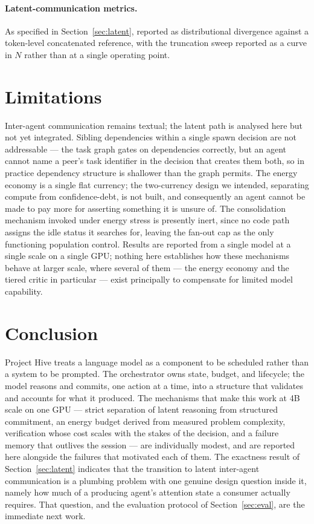 \documentclass[11pt]{article}
\begin{document}
\paragraph{Latent-communication metrics.} As specified in
Section~\ref{sec:latent}, reported as distributional divergence against a
token-level concatenated reference, with the truncation sweep reported as a
curve in $N$ rather than at a single operating point.

\section{Limitations}

Inter-agent communication remains textual; the latent path is analysed here but
not yet integrated. Sibling dependencies within a single spawn decision are not
addressable --- the task graph gates on dependencies correctly, but an agent
cannot name a peer's task identifier in the decision that creates them both, so
in practice dependency structure is shallower than the graph permits. The
energy economy is a single flat currency; the two-currency design we intended,
separating compute from confidence-debt, is not built, and consequently an
agent cannot be made to pay more for asserting something it is unsure of. The
consolidation mechanism invoked under energy stress is presently inert, since
no code path assigns the idle status it searches for, leaving the fan-out cap
as the only functioning population control. Results are reported from a single
model at a single scale on a single GPU; nothing here establishes how these
mechanisms behave at larger scale, where several of them --- the energy economy
and the tiered critic in particular --- exist principally to compensate for
limited model capability.

\section{Conclusion}

Project Hive treats a language model as a component to be scheduled rather than
a system to be prompted. The orchestrator owns state, budget, and lifecycle;
the model reasons and commits, one action at a time, into a structure that
validates and accounts for what it produced. The mechanisms that make this
work at 4B scale on one GPU --- strict separation of latent reasoning from
structured commitment, an energy budget derived from measured problem
complexity, verification whose cost scales with the stakes of the decision, and
a failure memory that outlives the session --- are individually modest, and are
reported here alongside the failures that motivated each of them. The exactness
result of Section~\ref{sec:latent} indicates that the transition to latent
inter-agent communication is a plumbing problem with one genuine design
question inside it, namely how much of a producing agent's attention state a
consumer actually requires. That question, and the evaluation protocol of
Section~\ref{sec:eval}, are the immediate next work.
\end{document}
